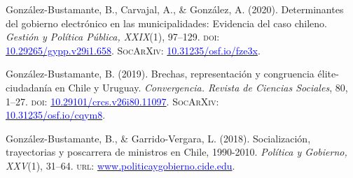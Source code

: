 \begin{publications}
\begin{benumerate}{9}
\item{\small González-Bustamante, B., Carvajal, A., \& González, A. (2020). Determinantes del gobierno electrónico en las municipalidades: Evidencia del caso chileno. {\itshape Gestión y Política Pública, XXIX}(1), 97--129. {\scshape doi:} \\ \href{http://dx.doi.org/10.29265/gypp.v29i1.658}{\textcolor{blue}{10.29265/gypp.v29i1.658}}. {\scshape \footnotesize SocArXiv:} \href{https://doi.org/10.31235/osf.io/fze3x}{\textcolor{blue}{10.31235/osf.io/fze3x}}.} \vspace{1mm}

\item{\small González-Bustamante, B. (2019). Brechas, representación y congruencia élite-ciudadanía en Chile y Uruguay. {\itshape Convergencia. Revista de Ciencias Sociales}, 80, 1--27. {\scshape doi}: \href{https://doi.org/10.29101/crcs.v26i80.11097}{\textcolor{blue}{10.29101/crcs.v26i80.11097}}. {\scshape \footnotesize SocArXiv:} \\ \href{https://doi.org/10.31235/osf.io/cqym8}{\textcolor{blue}{10.31235/osf.io/cqym8}}.}\vspace{1mm} %

\item{\small González-Bustamante, B., \& Garrido-Vergara, L. (2018). Socialización, trayectorias y poscarrera de ministros en Chile, 1990-2010. {\itshape Política y Gobierno, XXV}(1), 31--64. {\scshape url:} \href{http://www.politicaygobierno.cide.edu/index.php/pyg/article/view/1080}{\textcolor{blue}{www.politicaygobierno.cide.edu}}.}\vspace{1mm}

\end{benumerate}

\end{publications}


